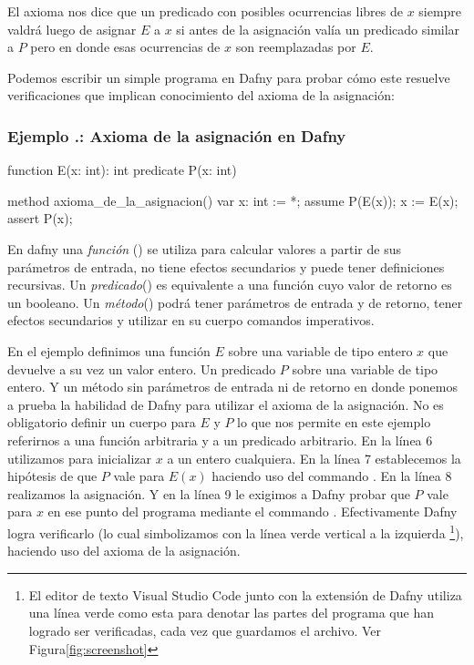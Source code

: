 \documentclass[12pt, a4paper, openany, fleqn]{book}
\newcounter{example}[chapter]
\renewcommand{\theexample}{\thechapter.\arabic{example}}
\newcommand{\example}[1]{
  \refstepcounter{example} %
  \subsubsection*{Ejemplo \theexample: #1}
}
\begin{document}
    El axioma nos dice que un predicado con posibles ocurrencias libres de $x$ siempre valdrá luego de asignar $E$ a $x$ si antes de la asignación valía un predicado similar a $P$ pero en donde esas ocurrencias de $x$ son reemplazadas por $E$.

    Podemos escribir un simple programa en Dafny para probar cómo este resuelve verificaciones que implican conocimiento del axioma de la asignación:

    \example{Axioma de la asignación en Dafny}
    \begin{greenbox}
    \begin{dafny}[gobble=8]
        function E(x: int): int
        predicate P(x: int)

        method axioma_de_la_asignacion()
        {
            var x: int := *;
            assume P(E(x));
            x := E(x);
            assert P(x);
        }
    \end{dafny}
    \end{greenbox}

    En dafny una \textit{función} () se utiliza para calcular valores a partir de sus parámetros de entrada, no tiene efectos secundarios y puede tener definiciones recursivas. Un \textit{predicado}() es equivalente a una función cuyo valor de retorno es un booleano. Un \textit{método}() podrá tener parámetros de entrada y de retorno, tener efectos secundarios y utilizar en su cuerpo comandos imperativos.

    En el ejemplo definimos una función $E$ sobre una variable de tipo entero $x$ que devuelve a su vez un valor entero.
    Un predicado $P$ sobre una variable de tipo entero.
    Y un método sin parámetros de entrada ni de retorno en donde ponemos a prueba la habilidad de Dafny para utilizar el axioma de la asignación.
    No es obligatorio definir un cuerpo para $E$ y $P$ lo que nos permite en este ejemplo referirnos a una función arbitraria y a un predicado arbitrario.
    En la línea 6 utilizamos  para inicializar $x$ a un entero cualquiera.
    En la línea 7 establecemos la hipótesis de que $P$ vale para $E(x)$ haciendo uso del commando .
    En la línea 8 realizamos la asignación.
    Y en la línea 9 le exigimos a Dafny probar que $P$ vale para $x$ en ese punto del programa mediante el commando .
    Efectivamente Dafny logra verificarlo (lo cual simbolizamos con la línea verde vertical a la izquierda \footnote{El editor de texto Visual Studio Code junto con la extensión de Dafny utiliza una línea verde como esta para denotar las partes del programa que han logrado ser verificadas, cada vez que guardamos el archivo. Ver Figura\ref{fig:screenshot}}), haciendo uso del axioma de la asignación.
\end{document}
